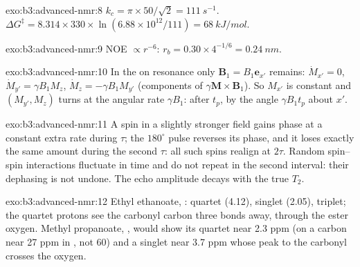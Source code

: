 \begin{solution}{exo:b3:advanced-nmr:8}
$k_c = \pi \times 50/\sqrt2 = \qty{111}{s^{-1}}$. $\Delta G^\ddagger = 8.314 \times 330 \times
\ln(6.88\times10^{12}/111) = \qty{68}{kJ/mol}$.
\end{solution}

\begin{solution}{exo:b3:advanced-nmr:9}
NOE $\propto r^{-6}$: $r_b = 0.30 \times 4^{-1/6} = \qty{0.24}{nm}$.
\end{solution}

\begin{solution}{exo:b3:advanced-nmr:10}
In the  on resonance only $\mathbf B_1 = B_1\mathbf e_{x'}$ remains:
$\dot M_{x'} = 0$, $\dot M_{y'} = \gamma B_1M_z$, $\dot M_z = -\gamma B_1M_{y'}$ (components of
$\gamma\mathbf M\times\mathbf B_1$). So $M_{x'}$ is constant and $(M_{y'}, M_z)$ turns at the angular
rate $\gamma B_1$: after $t_p$, by the angle $\gamma B_1t_p$ about $x'$.
\end{solution}

\begin{solution}{exo:b3:advanced-nmr:11}
A spin in a slightly stronger field gains phase at a constant extra rate during
$\tau$; the $180^\circ$ pulse reverses its phase, and it loses exactly the same amount
during the second $\tau$: all such spins realign at $2\tau$. Random spin--spin
interactions fluctuate in time and do not repeat in the second interval: their
dephasing is not undone. The echo amplitude decays with the true $T_2$.
\end{solution}

\begin{solution}{exo:b3:advanced-nmr:12}
Ethyl ethanoate, :  quartet (4.12),  singlet (2.05),
 triplet; the quartet protons see the carbonyl carbon three bonds away,
through the ester oxygen. Methyl propanoate, , would show its
quartet near 2.3 ppm (on a carbon near 27 ppm in , not 60) and a singlet
 near 3.7 ppm whose  peak to the carbonyl crosses the oxygen.
\end{solution}

